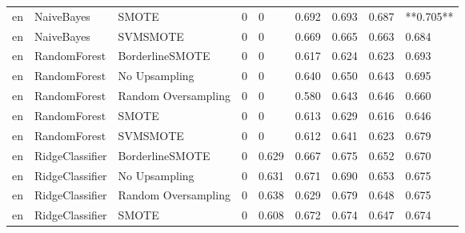 \begin{tabular}{lllllllll}
      en &                   NaiveBayes &               SMOTE &     0 &                         0 &                 0.692 &                  0.693 &                                   0.687 & **0.705** \\
      en &                   NaiveBayes &            SVMSMOTE &     0 &                         0 &                 0.669 &                  0.665 &                                   0.663 &     0.684 \\
      en &                 RandomForest &     BorderlineSMOTE &     0 &                         0 &                 0.617 &                  0.624 &                                   0.623 &     0.693 \\
      en &                 RandomForest &       No Upsampling &     0 &                         0 &                 0.640 &                  0.650 &                                   0.643 &     0.695 \\
      en &                 RandomForest & Random Oversampling &     0 &                         0 &                 0.580 &                  0.643 &                                   0.646 &     0.660 \\
      en &                 RandomForest &               SMOTE &     0 &                         0 &                 0.613 &                  0.629 &                                   0.616 &     0.646 \\
      en &                 RandomForest &            SVMSMOTE &     0 &                         0 &                 0.612 &                  0.641 &                                   0.623 &     0.679 \\
      en &              RidgeClassifier &     BorderlineSMOTE &     0 &                     0.629 &                 0.667 &                  0.675 &                                   0.652 &     0.670 \\
      en &              RidgeClassifier &       No Upsampling &     0 &                     0.631 &                 0.671 &                  0.690 &                                   0.653 &     0.675 \\
      en &              RidgeClassifier & Random Oversampling &     0 &                     0.638 &                 0.629 &                  0.679 &                                   0.648 &     0.675 \\
      en &              RidgeClassifier &               SMOTE &     0 &                     0.608 &                 0.672 &                  0.674 &                                   0.647 &     0.674 \\

\end{tabular}
